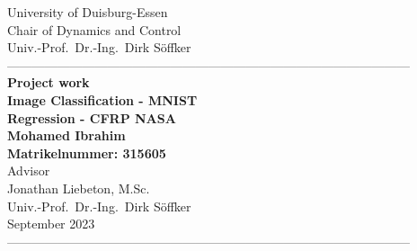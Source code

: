 \documentclass[12pt,fleqn]{article}
\begin{document}
\begin{titlepage}
  \begin{center}
    \vspace*{-2.5cm}
    \large{University of Duisburg-Essen}\\
   \large{Chair of Dynamics and Control}\\
    \large{Univ.-Prof.~Dr.-Ing.\ Dirk S\"offker}\\
    ------------------------------------------------------------------------------------------------\\[3.7cm]
    \LARGE{\textbf{Project work }}\\[1.5cm]
    \Large{\textbf{Image Classification - MNIST \\
    Regression - CFRP NASA }}\\[0.6cm]
    \vspace{1.2cm}
    \large{\textbf{Mohamed Ibrahim\\
    Matrikelnummer: 315605}}\\[1.5cm]
    \vspace*{3cm}
    \large{Advisor}\\[0.5cm]
    \large{Jonathan Liebeton, M.Sc.}\\
    \large{Univ.-Prof.\ Dr.-Ing.\ Dirk S\"offker }\\[0.5cm]\vfill
    \large{September 2023}\\[0.5cm]
    ------------------------------------------------------------------------------------------------\\[1.5cm]
  \end{center}
\end{titlepage}
%

\clearpage

\clearpage%
\tableofcontents
\clearpage
\listoffigures
\listoftables
\clearpage
{}
  
  \clearpage
  
  \clearpage
  
  \clearpage
\end{document}
